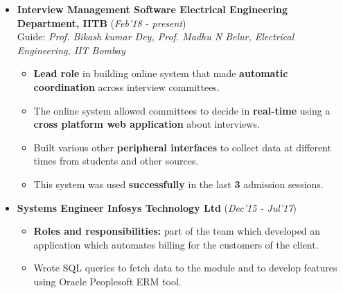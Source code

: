 \documentclass[10pt]{article}
\begin{document}
\vspace{-0.1cm}
\begin{itemize}[leftmargin=0.4cm]
	\item \textbf{Interview Management Software \textpipe  \hspace{0.05cm} Electrical Engineering Department, IITB} \hfill{(\textit{Feb'18 - present})}\\
	Guide: \textit{Prof. Bikash kumar Dey, Prof. Madhu N Belur, Electrical Engineering, IIT Bombay}\\
\vspace{-0.65cm}
\begin{itemize}
		\item  \textbf{Lead role }in building online system that made \textbf{automatic
coordination }across interview committees.\vspace{-0.1cm}
		\item The online system allowed committees to decide in \textbf{real-time} using a \textbf{cross platform web application} about interviews.

		\item Built various other \textbf{peripheral
interfaces} to collect data at different times from students and other sources.
		\item This system was used \textbf{successfully} in the last \textbf{3} admission sessions.
	\end{itemize}
\end{itemize}
\vspace{-0.4cm}
\begin{itemize}[leftmargin=0.4cm]
	\item \textbf{Systems Engineer \textpipe  \hspace{0.05cm} Infosys Technology Ltd} \hfill{(\textit{Dec'15 - Jul'17})}\\
	\vspace{-0.65cm}
	\begin{itemize}
\vspace{-0.07cm}
		\item \textbf{Roles and responsibilities:} part of the team which developed an application which automates billing for the customers of the client.\vspace{-0.1cm}
		\item Wrote SQL queries to fetch data to the module and to develop features using Oracle Peoplesoft ERM tool.
	\end{itemize}
\end{itemize}

\end{document}
